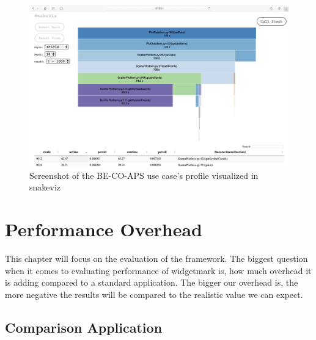\begin{figure}[h]
    \centering
    \includegraphics[width=15cm]{resources/img/profiles/ApsProfile}
    \caption{
        Screenshot of the BE-CO-APS use case's profile visualized in snakeviz
    }
    \label{fig:application:aps:usecase:profile:ht}
\end{figure}

\clearpage




\section{Performance Overhead}

This chapter will focus on the evaluation of the framework. The biggest question
when it comes to evaluating performance of widgetmark is, how much overhead it
is adding compared to a standard application. The bigger our overhead is, the
more negative the results will be compared to the realistic value we can expect.

\subsection{Comparison Application}

